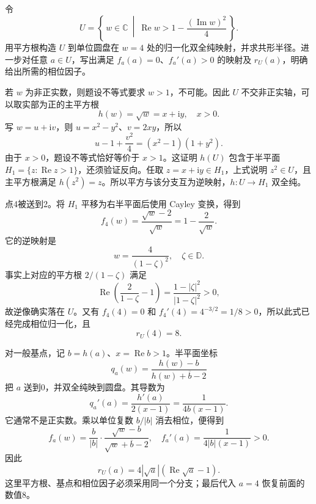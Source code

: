 \begin{exercise}\label{b3:ex:05-1}
令
\[
 U=\left\{\,w\in\mathbb C\ \middle|\ 
 \operatorname{Re}w>1-\frac{(\operatorname{Im}w)^2}{4}\,\right\}.
\]
用平方根构造 \(U\) 到单位圆盘在 \(w=4\) 处的归一化双全纯映射，并求共形半径。进一步对任意 \(a\in U\)，写出满足 \(f_a(a)=0\)、\(f_a'(a)>0\) 的映射及 \(r_U(a)\)，明确给出所需的相位因子。
\end{exercise}
\begin{solution}
若 \(w\) 为非正实数，则题设不等式要求 \(w>1\)，不可能。因此 \(U\) 不交非正实轴，可以取实部为正的主平方根
\[
 h(w)=\sqrt w=x+\mathrm{i}y,\quad x>0.
\]
写 \(w=u+\mathrm{i}v\)，则 \(u=x^2-y^2\)、\(v=2xy\)，所以
\[
 u-1+\frac{v^2}{4}
 =(x^2-1)(1+y^2).
\]
由于 \(x>0\)，题设不等式恰好等价于 \(x>1\)。这证明 \(h(U)\) 包含于半平面 \(H_1=\{z:\operatorname{Re}z>1\}\)，还须验证反向。任取 \(z=x+\mathrm{i}y\in H_1\)，上式说明 \(z^2\in U\)，且主平方根满足 \(h(z^2)=z\)。所以平方与该分支互为逆映射，\(h:U\rightarrow H_1\) 双全纯。

点4被送到2。将 \(H_1\) 平移为右半平面后使用 Cayley 变换，得到
\[
 f_4(w)=\frac{\sqrt w-2}{\sqrt w}
       =1-\frac2{\sqrt w}.
\]
它的逆映射是
\[
 w=\frac4{(1-\zeta)^2},\quad \zeta\in\mathbb D.
\]
事实上对应的平方根 \(2/(1-\zeta)\) 满足
\[
 \operatorname{Re}\left(\frac2{1-\zeta}-1\right)
 =\frac{1-|\zeta|^2}{|1-\zeta|^2}>0,
\]
故逆像确实落在 \(U\)。又有 \(f_4(4)=0\) 和 \(f_4'(4)=4^{-3/2}=1/8>0\)，所以此式已经完成相位归一化，且
\[
 r_U(4)=8.
\]

对一般基点，记 \(b=h(a)\)、\(x=\operatorname{Re}b>1\)。半平面坐标
\[
 q_a(w)=\frac{h(w)-b}{h(w)+\overline b-2}
\]
把 \(a\) 送到0，并双全纯映到圆盘。其导数为
\[
 q_a'(a)=\frac{h'(a)}{2(x-1)}
        =\frac1{4b(x-1)}.
\]
它通常不是正实数。乘以单位复数 \(b/|b|\) 消去相位，便得到
\[
 f_a(w)=\frac b{|b|}\cdot
 \frac{\sqrt w-b}{\sqrt w+\overline b-2},
 \quad
 f_a'(a)=\frac1{4|b|(x-1)}>0.
\]
因此
\[
 r_U(a)=4|\sqrt a|\left(\operatorname{Re}\sqrt a-1\right).
\]
这里平方根、基点和相位因子必须采用同一个分支；最后代入 \(a=4\) 恢复前面的数值8。
\end{solution}

